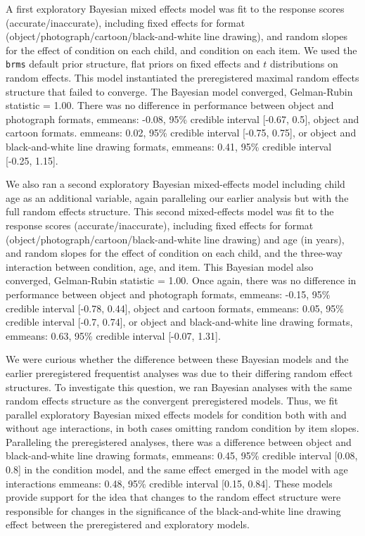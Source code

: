 \documentclass[10pt, letterpaper]{article}
\begin{document}
A first exploratory Bayesian mixed effects model was fit to the response
scores (accurate/inaccurate), including fixed effects for format
(object/photograph/cartoon/black-and-white line drawing), and random
slopes for the effect of condition on each child, and condition on each
item. We used the \texttt{brms} default prior structure, flat priors on
fixed effects and \(t\) distributions on random effects. This model
instantiated the preregistered maximal random effects structure that
failed to converge. The Bayesian model converged, Gelman-Rubin statistic
= 1.00. There was no difference in performance between object and
photograph formats, emmeans: -0.08, 95\% credible interval {[}-0.67,
0.5{]}, object and cartoon formats. emmeans: 0.02, 95\% credible
interval {[}-0.75, 0.75{]}, or object and black-and-white line drawing
formats, emmeans: 0.41, 95\% credible interval {[}-0.25, 1.15{]}.

We also ran a second exploratory Bayesian mixed-effects model including
child age as an additional variable, again paralleling our earlier
analysis but with the full random effects structure. This second
mixed-effects model was fit to the response scores
(accurate/inaccurate), including fixed effects for format
(object/photograph/cartoon/black-and-white line drawing) and age (in
years), and random slopes for the effect of condition on each child, and
the three-way interaction between condition, age, and item. This
Bayesian model also converged, Gelman-Rubin statistic = 1.00. Once
again, there was no difference in performance between object and
photograph formats, emmeans: -0.15, 95\% credible interval {[}-0.78,
0.44{]}, object and cartoon formats, emmeans: 0.05, 95\% credible
interval {[}-0.7, 0.74{]}, or object and black-and-white line drawing
formats, emmeans: 0.63, 95\% credible interval {[}-0.07, 1.31{]}.

We were curious whether the difference between these Bayesian models and
the earlier preregistered frequentist analyses was due to their
differing random effect structures. To investigate this question, we ran
Bayesian analyses with the same random effects structure as the
convergent preregistered models. Thus, we fit parallel exploratory
Bayesian mixed effects models for condition both with and without age
interactions, in both cases omitting random condition by item slopes.
Paralleling the preregistered analyses, there was a difference between
object and black-and-white line drawing formats, emmeans: 0.45, 95\%
credible interval {[}0.08, 0.8{]} in the condition model, and the same
effect emerged in the model with age interactions emmeans: 0.48, 95\%
credible interval {[}0.15, 0.84{]}. These models provide support for the
idea that changes to the random effect structure were responsible for
changes in the significance of the black-and-white line drawing effect
between the preregistered and exploratory models.
\end{document}

